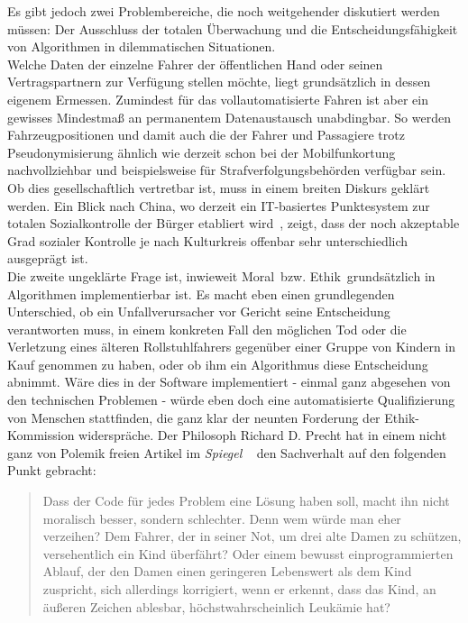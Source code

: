 \documentclass[twoside,a4paper,12pt]{article}
\begin{document}
Es gibt jedoch zwei Problembereiche, die noch weitgehender diskutiert werden müssen: Der Ausschluss der totalen Überwachung und die 
Entscheidungsfähigkeit von Algorithmen in dilemmatischen Situationen.\\

Welche Daten der einzelne Fahrer der öffentlichen Hand oder seinen Vertragspartnern zur Verfügung stellen möchte, liegt grundsätzlich in dessen eigenem
Ermessen. Zumindest für das vollautomatisierte Fahren ist aber ein gewisses Mindestmaß an permanentem Datenaustausch unabdingbar. So werden 
Fahrzeugpositionen und damit auch die der Fahrer und Passagiere trotz Pseudonymisierung ähnlich wie derzeit schon bei der Mobilfunkortung nachvollziehbar 
und beispielsweise für Strafverfolgungsbehörden verfügbar sein. Ob dies gesellschaftlich vertretbar ist, muss in einem breiten Diskurs geklärt werden.  
Ein Blick nach China, wo derzeit ein IT-basiertes Punktesystem zur totalen Sozialkontrolle der Bürger etabliert wird~\cite{df}, zeigt, dass der noch akzeptable 
Grad sozialer Kontrolle je nach Kulturkreis offenbar sehr unterschiedlich ausgeprägt ist.\\

Die zweite ungeklärte Frage ist, inwieweit \glqq Moral\grqq\ bzw. \glqq Ethik\grqq\ grundsätzlich in Algorithmen implementierbar ist. Es macht eben einen grundlegenden
Unterschied, ob ein Unfallverursacher vor Gericht seine Entscheidung verantworten muss, in einem konkreten Fall den möglichen Tod oder die Verletzung eines älteren Rollstuhlfahrers gegenüber einer Gruppe von Kindern in Kauf genommen zu haben, oder ob ihm ein Algorithmus diese Entscheidung abnimmt. Wäre dies in der Software 
implementiert - einmal ganz abgesehen von den technischen Problemen - würde eben doch eine automatisierte Qualifizierung von Menschen stattfinden, die ganz 
klar der neunten Forderung der Ethik-Kommission widerspräche. Der Philosoph Richard D. Precht hat in einem nicht ganz von Polemik freien Artikel im \textit{Spiegel}
~\cite{pr} den Sachverhalt auf den folgenden Punkt gebracht:

\begin{quote}
\glqq
Dass der Code für jedes Problem eine Lösung haben soll, macht ihn nicht moralisch besser, sondern schlechter. Denn wem würde man eher verzeihen? Dem Fahrer,
der in seiner Not, um drei alte Damen zu schützen, versehentlich ein Kind überfährt? Oder einem bewusst einprogrammierten Ablauf, der den Damen einen
geringeren Lebenswert als dem Kind zuspricht, sich allerdings korrigiert, wenn er erkennt, dass das Kind, an äußeren Zeichen ablesbar, höchstwahrscheinlich
Leukämie hat?\grqq\mbox{~\cite[S. 79]{pr}}
\end{quote}
\end{document}
